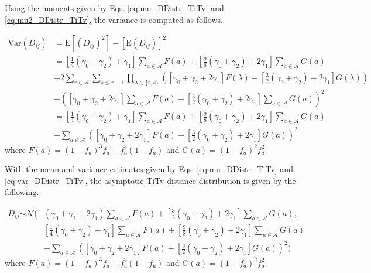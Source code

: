 \documentclass[10pt,letterpaper]{article}\usepackage[]{graphicx}\usepackage[]{color}
\begin{document}
Using the moments given by Eqs. \ref{eq:mu_DDistr_TiTv} and \ref{eq:mu2_DDistr_TiTv}, the variance is computed as follows.

\begin{equation}\label{eq:var_DDistr_TiTv}
\begin{aligned}
\text{Var}(D_{ij}) &= \text{E}\left[(D_{ij})^2\right] - \left[\text{E}(D_{ij})\right]^2 \\
&=\left[\frac{1}{4}(\gamma_0 + \gamma_2) + \gamma_1\right] \sum_{a \in \mathcal{A}} F(a) + \left[\frac{9}{8}(\gamma_0 + \gamma_2) + 2\gamma_1\right] \sum_{a \in \mathcal{A}} G(a) \\
&+ 2 \sum_{r \in \mathcal{A}} \sum_{s \leq r - 1} \prod_{\lambda \in \{r,s\}} \left([\gamma_0 + \gamma_2 + 2\gamma_1] F(\lambda) + \left[\frac{3}{2}(\gamma_0 + \gamma_2) + 2\gamma_1\right] G(\lambda)\right) \\
&- \left([\gamma_0 + \gamma_2 + 2\gamma_1] \sum_{a \in \mathcal{A}} F(a) + \left[\frac{3}{2}(\gamma_0 + \gamma_2) + 2\gamma_1\right] \sum_{a \in \mathcal{A}} G(a)\right)^2 \\
&=\left[\frac{1}{4}(\gamma_0 + \gamma_2) + \gamma_1\right] \sum_{a \in \mathcal{A}} F(a) + \left[\frac{9}{8}(\gamma_0 + \gamma_2) + 2\gamma_1\right] \sum_{a \in \mathcal{A}} G(a) \\
&+ \sum_{a \in \mathcal{A}} \left([\gamma_0 + \gamma_2 + 2\gamma_1] F(a) + \left[\frac{3}{2}(\gamma_0 + \gamma_2) + 2\gamma_1\right] G(a)\right)^2
\end{aligned}
\end{equation}
where $F(a) = (1 - f_a)^3 f_a + f^3_a (1 - f_a)$ and $G(a) = (1 - f_a)^2 f^2_a$.

With the mean and variance estimates given by Eqs. \ref{eq:mu_DDistr_TiTv} and \ref{eq:var_DDistr_TiTv}, the asymptotic TiTv distance distribution is given by the following.

\begin{equation}\label{eq:DDistr_TiTv}
\begin{aligned}
D_{ij} \overset{.}{\sim} \mathcal{N}\Biggl(& (\gamma_0 + \gamma_2 + 2\gamma_1) \sum_{a \in \mathcal{A}} F(a) + \left[\frac{3}{2}(\gamma_0 + \gamma_2) + 2\gamma_1\right] \sum_{a \in \mathcal{A}} G(a), \\
&\left[\frac{1}{4}(\gamma_0 + \gamma_2) + \gamma_1\right] \sum_{a \in \mathcal{A}} F(a) + \left[\frac{9}{8}(\gamma_0 + \gamma_2) + 2\gamma_1\right] \sum_{a \in \mathcal{A}} G(a) \\
&+ \sum_{a \in \mathcal{A}} \left([\gamma_0 + \gamma_2 + 2\gamma_1] F(a) + \left[\frac{3}{2}(\gamma_0 + \gamma_2) + 2\gamma_1\right] G(a)\right)^2\Biggr)
\end{aligned}
\end{equation}
where $F(a) = (1 - f_a)^3 f_a + f^3_a (1 - f_a)$ and $G(a) = (1 - f_a)^2 f^2_a$.
\end{document}
